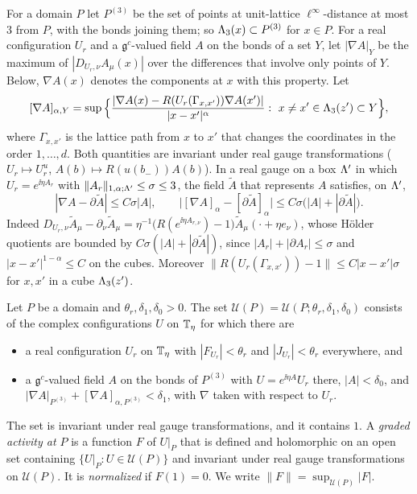 For a domain $P$ let $P^{(3)}$ be the set of points at unit-lattice $\ell^\infty$-distance at most $3$ from $P$, with the bonds joining them; so $\Lambda_3(x)\subset P^{(3)}$ for $x\in P$. For a real configuration $U_r$ and a $\mathfrak g^c$-valued field $A$ on the bonds of a set $Y$, let $|\nabla A|_Y$ be the maximum of $|D_{U_r,\nu}A_\mu(x)|$ over the differences that involve only points of $Y$. Below, $\nabla A(x)$ denotes the components at $x$ with this property. Let
\[
[\nabla A]_{\alpha,Y}=\sup\Big\{\frac{|\nabla A(x)-R(U_r(\Gamma_{x,x'}))\nabla A(x')|}{|x-x'|^\alpha}:\ x\neq x'\in\Lambda_3(z')\subset Y\Big\},
\]
where $\Gamma_{x,x'}$ is the lattice path from $x$ to $x'$ that changes the coordinates in the order $1,\dots,d$. Both quantities are invariant under real gauge transformations ($U_r\mapsto U_r^u$, $A(b)\mapsto R(u(b_-))A(b)$). In a real gauge on a box $\Lambda'$ in which $U_r=e^{\ii\eta A_r}$ with $\|A_r\|_{1,\alpha;\Lambda'}\le\sigma\le3$, the field $\tilde A$ that represents $A$ satisfies, on $\Lambda'$,
\begin{equation}\label{eq:cov-vs-flat}
|\nabla A-\partial\tilde A|\le C\sigma|A|,\qquad\big|[\nabla A]_\alpha-[\partial\tilde A]_\alpha\big|\le C\sigma\big(|A|+|\partial\tilde A|\big).
\end{equation}
Indeed $D_{U_r,\nu}\tilde A_\mu-\partial_\nu\tilde A_\mu=\eta^{-1}\big(R(e^{\ii\eta A_{r,\nu}})-1\big)\tilde A_\mu(\cdot+\eta e_\nu)$, whose H\"older quotients are bounded by $C\sigma(|A|+|\partial\tilde A|)$, since $|A_r|+|\partial A_r|\le\sigma$ and $|x-x'|^{1-\alpha}\le C$ on the cubes. Moreover $\|R(U_r(\Gamma_{x,x'}))-1\|\le C|x-x'|\sigma$ for $x,x'$ in a cube $\Lambda_3(z')$.

\begin{definition}\label{def:graded}
Let $P$ be a domain and $\theta_r,\delta_1,\delta_0>0$. The set $\mathcal U(P)=\mathcal U(P;\theta_r,\delta_1,\delta_0)$ consists of the complex configurations $U$ on $\mathbb T_\eta$ for which there are
\begin{itemize}
\item a real configuration $U_r$ on $\mathbb T_\eta$ with $|F_{U_r}|<\theta_r$ and $|J_{U_r}|<\theta_r$ everywhere, and
\item a $\mathfrak g^c$-valued field $A$ on the bonds of $P^{(3)}$ with $U=e^{\ii\eta A}U_r$ there, $|A|<\delta_0$, and $|\nabla A|_{P^{(3)}}+[\nabla A]_{\alpha,P^{(3)}}<\delta_1$, with $\nabla$ taken with respect to $U_r$.
\end{itemize}
The set is invariant under real gauge transformations, and it contains $1$. A \emph{graded activity at $P$} is a function $F$ of $U|_P$ that is defined and holomorphic on an open set containing $\{U|_P:U\in\mathcal U(P)\}$ and invariant under real gauge transformations on $\mathcal U(P)$. It is \emph{normalized} if $F(1)=0$. We write $\|F\|=\sup_{\mathcal U(P)}|F|$.
\end{definition}

